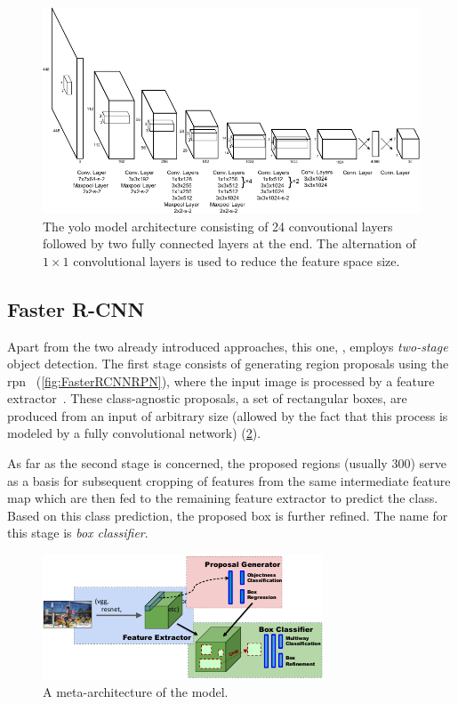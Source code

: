 \begin{figure}[t]
    \centerline{\includegraphics[width=0.8\linewidth]{figures/theoretical_foundations/yolo_architecture.pdf}}
    \caption[\Gls{yolo} architecture]{The \gls{yolo} model architecture consisting of 24 convoutional layers followed by two fully connected layers at the end. The alternation of $1 \times 1$ convolutional layers is used to reduce the feature space size. }
    \label{fig:YOLOArchitecture}
\end{figure}

\subsection{Faster R-CNN}
\label{ssec:FasterRCNN}

Apart from the two already introduced approaches, this one, , employs \emph{two-stage} object detection. The first stage consists of generating region proposals using the \gls{rpn}~\cite{Ren2017} (\cref{fig:FasterRCNNRPN}), where the input image is processed by a feature extractor~\cite{Huang2017}. These class-agnostic proposals, a set of rectangular boxes, are produced from an input of arbitrary size (allowed by the fact that this process is modeled by a fully convolutional network) (\cref{fig:FasterRCNNMetaArch}).

As far as the second stage is concerned, the proposed regions (usually $300$) serve as a basis for subsequent cropping of features from the same intermediate feature map which are then fed to the remaining feature extractor to predict the class. Based on this class prediction, the proposed box is further refined. The name for this stage is \emph{box classifier}.

\begin{figure}[t]
    \centerline{\includegraphics[width=0.7\linewidth]{figures/theoretical_foundations/faster_rcnn_metaarchitecture.pdf}}
    \caption[ meta-architecture]{A meta-architecture of the  model. }
    \label{fig:FasterRCNNMetaArch}
\end{figure}


